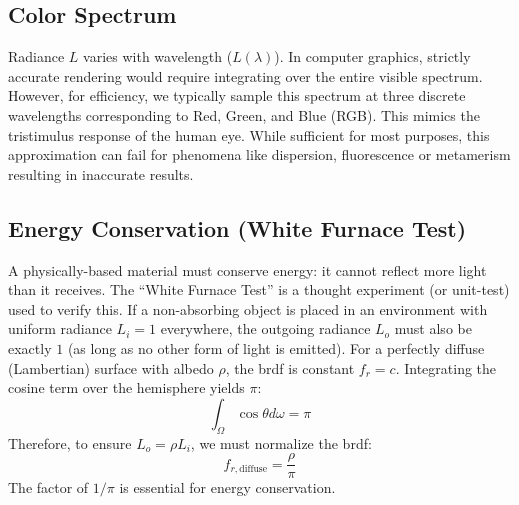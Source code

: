 \subsection{Color Spectrum}

Radiance $L$ varies with wavelength ($L(\lambda)$).
In computer graphics, strictly accurate rendering would require integrating over the entire visible spectrum.
However, for efficiency, we typically sample this spectrum at three discrete wavelengths corresponding to Red, Green,
and Blue (RGB).
This mimics the tristimulus response of the human eye.
While sufficient for most purposes, this approximation can fail for phenomena like
dispersion, fluorescence or metamerism resulting in inaccurate results.

\subsection{Energy Conservation (White Furnace Test)}

A physically-based material must conserve energy: it cannot reflect more light than it receives.
The ``White Furnace Test'' is a thought experiment (or unit-test) used to verify this.
If a non-absorbing object is placed in an environment with uniform radiance $L_i = 1$ everywhere,
the outgoing radiance $L_o$ must also be exactly $1$ (as long as no other form of light is emitted).
For a perfectly diffuse (Lambertian) surface with albedo $\rho$, the \gls{brdf} is constant $f_r = c$.
Integrating the cosine term over the hemisphere yields $\pi$:
\[
    \int_{\Omega} \cos\theta d\omega = \pi
\]
Therefore, to ensure $L_o = \rho L_i$, we must normalize the \gls{brdf}:
\[
f_{r, \text{diffuse}} = \frac{\rho}{\pi}
\]
The factor of $1/\pi$ is essential for energy conservation.